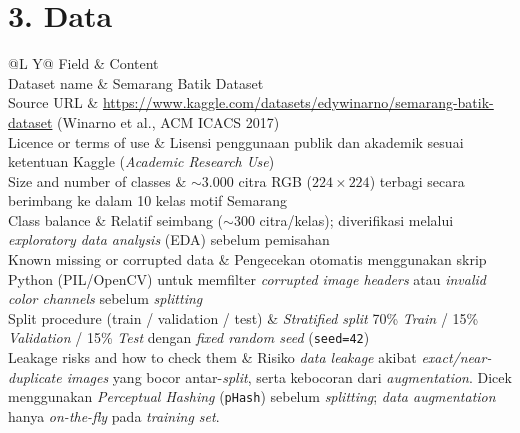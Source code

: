 \documentclass[9pt,a4paper]{extarticle}
\makeatletter
\renewcommand{\arraystretch}{1.12}
\newcommand{\proposalTable}[1]{%
    \renewcommand{\arraystretch}{1.14}%
    \begin{tabularx}{\textwidth}{@{}L Y@{}}
    \toprule[0.7pt]
    \textcolor{muted}{Field} & \textcolor{muted}{Content}\\
    \midrule
    #1
    \bottomrule[0.7pt]
    \end{tabularx}%
}
\makeatother
\begin{document}
\section*{3. Data}
\proposalTable{%
    Dataset name & Semarang Batik Dataset\\
    Source URL & \url{https://www.kaggle.com/datasets/edywinarno/semarang-batik-dataset} (Winarno et al., ACM ICACS 2017)\\
    Licence or terms of use & Lisensi penggunaan publik dan akademik sesuai ketentuan Kaggle (\textit{Academic Research Use})\\
    Size and number of classes & $\sim 3.000$ citra RGB ($224\times224$) terbagi secara berimbang ke dalam 10 kelas motif Semarang\\
    Class balance & Relatif seimbang ($\sim 300$ citra/kelas); diverifikasi melalui \textit{exploratory data analysis} (EDA) sebelum pemisahan\\
    Known missing or corrupted data & Pengecekan otomatis menggunakan skrip Python (PIL/OpenCV) untuk memfilter \textit{corrupted image headers} atau \textit{invalid color channels} sebelum \textit{splitting}\\
    Split procedure (train / validation / test) & \textit{Stratified split} 70\% \textit{Train} / 15\% \textit{Validation} / 15\% \textit{Test} dengan \textit{fixed random seed} (\texttt{seed=42})\\
    Leakage risks and how to check them & Risiko \textit{data leakage} akibat \textit{exact/near-duplicate images} yang bocor antar-\textit{split}, serta kebocoran dari \textit{augmentation}. Dicek menggunakan \textit{Perceptual Hashing} (\texttt{pHash}) sebelum \textit{splitting}; \textit{data augmentation} hanya \textit{on-the-fly} pada \textit{training set}.\\
}

\clearpage
\end{document}

